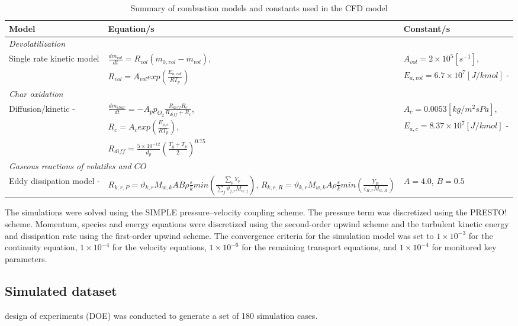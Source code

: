\documentclass[a4paper,fleqn]{cas-sc}
\begin{document}
\begin{table}[h!]
\caption{Summary of combustion models and constants used in the CFD model}\label{tbl_combust}
\begin{tabular*}{\tblwidth}{p{}p{}p{}}
\toprule
Model & Equation/s & Constant/s\\
\midrule
\multicolumn{3}{l}{\textit{Devolatilization}} \\ %
Single rate kinetic model &$\frac{dm_{vol}}{dt} = R_{vol}(m_{0,vol}-m_{vol})$,  & $A_{vol} = 2\times10^5 [s^{-1}]$, \\
& $R_{vol} = A_{vol}exp\left(\frac{E_{a,vol}}{RT_p}\right)$ & $ E_{a,vol} = 6.7\times10^7 [J/kmol]$ - \cite{Sheng2004} \\
\multicolumn{3}{l}{\textit{Char oxidation}} \\
Diffusion/kinetic - \citep{Baum1971} & $\frac{dm_{char}}{dt} = -A_p p_{O_{2}} \frac{R_{diff}R_c}{R_{diff} + R_c}$,  & $A_{c} = 0.0053 [kg/m^2sPa]$, \\
& $R_{c} = A_{c}exp\left(\frac{E_{a,c}}{RT_p}\right)$,  & $E_{a,c} = 8.37\times10^7 [J/kmol]$ - \cite{Sheng2004} \\
& $R_{diff} = \frac{5\times10^{-12}}{d_p} \left(\frac{T_g+T_p}{2}\right)^{0.75}$&\\
\multicolumn{3}{l}{\textit{Gaseous reactions of volatiles and $CO$}} \\
Eddy dissipation model - \cite{Ansys} & $R_{k,r,P} =\vartheta_{k,r}M_{w,k}AB\rho\frac{\varepsilon}{k}min\left(\frac{\sum_{p} Y_p}{\sum_{j}\vartheta_{j,r}M_{w,j}}\right)$, $R_{k,r,R} =\vartheta_{k,r}M_{w,k}A\rho\frac{\varepsilon}{k}min\left(\frac{Y_R}{\varepsilon_{R,r}M_{w,R}}\right)$ & $A=4.0$, $B=0.5$\\
\bottomrule
\end{tabular*}
\end{table}

The simulations were solved using the SIMPLE pressure–velocity coupling scheme. The pressure term was discretized using the PRESTO! scheme. Momentum, species and energy equations were discretized using the second-order upwind scheme and the turbulent kinetic energy and dissipation rate using the first-order upwind scheme. The convergence criteria for the simulation model was set to $1\times10^{-3}$ for the continuity equation, $1\times10^{-4}$ for the velocity equations, $1\times10^{-6}$ for the remaining transport equations, and $1\times10^{-4}$ for monitored key parameters.

\subsection{Simulated dataset}
design of experiments (DOE) was conducted to generate a set of 180 simulation cases.
\end{document}
